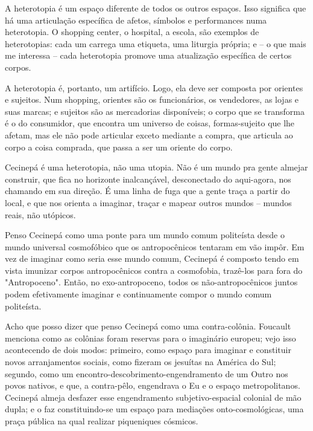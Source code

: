 A heterotopia é um espaço diferente de todos os outros espaços. Isso significa que há uma articulação específica de afetos, símbolos e performances numa heterotopia. O shopping center, o hospital, a escola, são exemplos de heterotopias: cada um carrega uma etiqueta, uma liturgia própria; e -- o que mais me interessa -- cada heterotopia promove uma atualização específica de certos corpos.

A heterotopia é, portanto, um artifício. Logo, ela deve ser composta por orientes e sujeitos. Num shopping, orientes são os funcionários, os vendedores, as lojas e suas marcas; e sujeitos são as mercadorias disponíveis; o corpo que se transforma é o do consumidor, que encontra um universo de coisas, formas-sujeito que lhe afetam, mas ele não pode articular exceto mediante a compra, que articula ao corpo a coisa comprada, que passa a ser um oriente do corpo.

Cecinepá é uma heterotopia, não uma utopia. Não é um mundo pra gente almejar construir, que fica no horizonte inalcançável, desconectado do aqui-agora, nos chamando em sua direção. É uma linha de fuga que a gente traça a partir do local, e que nos orienta a imaginar, traçar e mapear outros mundos -- mundos reais, não utópicos.

Penso Cecinepá como uma ponte para um mundo comum politeísta desde o mundo universal cosmofóbico que os antropocênicos tentaram em vão impôr. Em vez de imaginar como seria esse mundo comum, Cecinepá é composto tendo em vista imunizar corpos antropocênicos contra a cosmofobia, trazê-los para fora do "Antropoceno". Então, no exo-antropoceno, todos os não-antropocênicos juntos podem efetivamente imaginar e continuamente compor o mundo comum politeísta.


Acho que posso dizer que penso Cecinepá como uma contra-colônia. Foucault menciona como as colônias foram reservas para o imaginário europeu; vejo isso acontecendo de dois modos: primeiro, como espaço para imaginar e constituir novos arranjamentos sociais, como fizeram os jesuítas na América do Sul; segundo, como um encontro-descobrimento-engendramento de um Outro nos povos nativos, e que, a contra-pêlo, engendrava o Eu e o espaço metropolitanos. Cecinepá almeja desfazer esse engendramento subjetivo-espacial colonial de mão dupla; e o faz constituindo-se um espaço para mediações onto-cosmológicas, uma praça pública na qual realizar piqueniques cósmicos.

